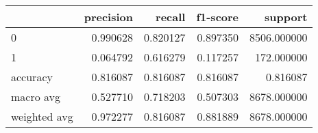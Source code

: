 \begin{tabular}{lrrrr}
\toprule
{} &  precision &    recall &  f1-score &      support \\
\midrule
0            &   0.990628 &  0.820127 &  0.897350 &  8506.000000 \\
1            &   0.064792 &  0.616279 &  0.117257 &   172.000000 \\
accuracy     &   0.816087 &  0.816087 &  0.816087 &     0.816087 \\
macro avg    &   0.527710 &  0.718203 &  0.507303 &  8678.000000 \\
weighted avg &   0.972277 &  0.816087 &  0.881889 &  8678.000000 \\
\bottomrule
\end{tabular}
